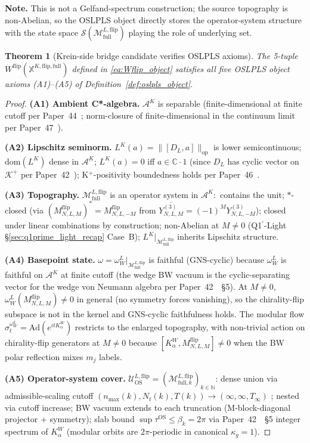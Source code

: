 \documentclass[11pt,a4paper]{article}
\theoremstyle{plain}
\newtheorem{theorem}{Theorem}[section]
\theoremstyle{definition}
\newcommand{\nmax}{n_{\max}}
\newcommand{\Nt}{N_{t}}
\newcommand{\Krein}{\mathcal{K}}
\newcommand{\Acal}{\mathcal{A}}
\newcommand{\Scal}{\mathcal{S}}
\newcommand{\Mcal}{\mathcal{M}}
\newcommand{\Ucal}{\mathcal{U}}
\newcommand{\opnorm}[1]{\lVert #1 \rVert_{\mathrm{op}}}
\newcommand{\C}{\mathbb{C}}
\newcommand{\N}{\mathbb{N}}
\newcommand{\DL}{D_{L}}
\newcommand{\Kplus}{\Krein^{+}}
\newcommand{\BWvac}{\omega_{W}^{L}}
\newcommand{\Kalpha}{K_{\alpha}^{W}}
\newcommand{\kappag}{\kappa_{g}}
\newcommand{\tauOS}{\tau^{\mathrm{OS}}}
\newcommand{\Mflipfull}{\Mcal^{L,\mathrm{flip}}_{\mathrm{full}}}
\newcommand{\Wflip}{W^{\mathrm{flip}}}
\newcommand{\Mflip}[3]{M^{\mathrm{flip}}_{#1,#2,#3}}
\newcommand{\osXkrein}{\mathbb{X}^{K,\mathrm{flip},\mathrm{full}}}
\begin{document}
\textbf{Note.} This is not a Gelfand-spectrum construction; the source
topography is non-Abelian, so the OSLPLS object directly stores the
operator-system structure with the state space $\Scal(\Mflipfull)$
playing the role of underlying set.

\begin{theorem}[Krein-side bridge candidate verifies OSLPLS axioms]
\label{thm:krein_side_oslpls}
The 5-tuple $\Wflip(\osXkrein)$ defined in \eqref{eq:Wflip_object}
satisfies all five OSLPLS object axioms (A1)--(A5) of
Definition~\ref{def:oslpls_object}.
\end{theorem}

\begin{proof}
\textbf{(A1) Ambient C*-algebra.} $\Acal^{K}$ is separable
(finite-dimensional at finite cutoff per Paper~44~\cite{paper44};
norm-closure of finite-dimensional in the continuum limit per
Paper~47~\cite{paper47}). \checkmark

\textbf{(A2) Lipschitz seminorm.} $L^{K}(a)=\opnorm{[\DL,a]}$ is
lower semicontinuous; $\mathrm{dom}(L^{K})$ dense in $\Acal^{K}$;
$L^{K}(a)=0$ iff $a\in\C\cdot 1$ (since $\DL$ has cyclic vector on
$\Kplus$ per Paper~42~\cite{paper42}); K$^{+}$-positivity boundedness
holds per Paper~46~\cite{paper46}. \checkmark

\textbf{(A3) Topography.} $\Mflipfull$ is an operator system in
$\Acal^{K}$:\ contains the unit; $*$-closed
(via $(\Mflip{N}{L}{M})^{*}=\Mflip{N}{L}{-M}$ from
$\overline{Y^{(3)}_{N,L,M}}=(-1)^{M}Y^{(3)}_{N,L,-M}$); closed under
linear combinations by construction; non-Abelian at $M\ne 0$
(Q1$^{\prime}$-Light \S\ref{sec:q1prime_light_recap} Case~B);
$L^{K}|_{\Mflipfull}$ inherits Lipschitz structure. \checkmark

\textbf{(A4) Basepoint state.} $\omega=\BWvac|_{\Mflipfull}$ is
faithful (GNS-cyclic) because $\BWvac$ is faithful on $\Acal^{K}$ at
finite cutoff (the wedge BW vacuum is the cyclic-separating vector
for the wedge von Neumann algebra per Paper~42~\cite{paper42}~\S 5).
At $M\ne 0$, $\BWvac(\Mflip{N}{L}{M})\ne 0$ in general (no symmetry
forces vanishing), so the chirality-flip subspace is not in the
kernel and GNS-cyclic faithfulness holds. The modular flow
$\sigma_{t}^{\BWvac}=\mathrm{Ad}(e^{it\Kalpha})$ restricts to the
enlarged topography, with non-trivial action on chirality-flip
generators at $M\ne 0$ because
$[\Kalpha,\Mflip{N}{L}{M}]\ne 0$ when the BW polar reflection mixes
$m_{j}$ labels. \checkmark

\textbf{(A5) Operator-system cover.}
$\Ucal^{L,\mathrm{flip}}_{\mathrm{OS}}=(\Mcal^{L,\mathrm{flip}}_{\mathrm{full},k})_{k\in\N}$:
dense union via admissible-scaling cutoff
$(\nmax(k),\Nt(k),T(k))\to(\infty,\infty,T_{\infty})$
\cite{paper47}; nested via cutoff increase; BW vacuum extends to each
truncation (M-block-diagonal projector + symmetry); slab bound
$\sup\tauOS\le\beta_{k}=2\pi$ via Paper~42~\cite{paper42}~\S 5 integer
spectrum of $\Kalpha$ (modular orbits are $2\pi$-periodic in canonical
$\kappag=1$). \checkmark
\end{proof}
\end{document}
